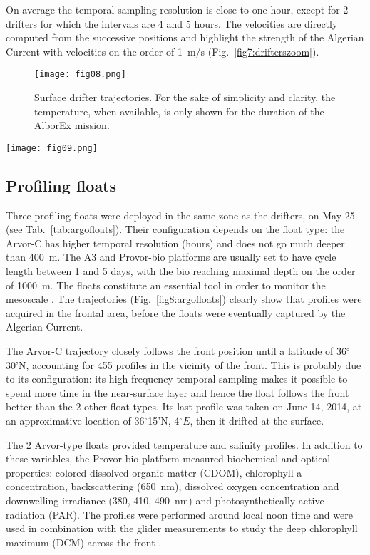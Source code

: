 \documentclass[essd,manuscript]{copernicus}
\begin{document}
On average the temporal sampling resolution is close to one hour, except for 2 drifters for which the intervals are 4 and 5 hours. The velocities are directly computed from the successive positions and highlight the strength of the Algerian Current with velocities on the order of 1~m/s (Fig.~\ref{fig7:drifterszoom}).    

\begin{figure}[t]
\texttt{[image: fig08.png]}
\caption{Surface drifter trajectories. For the sake of simplicity and clarity, the temperature, when available, is only shown for the duration of the AlborEx mission.\label{fig3:drifters}}
\end{figure}

\begin{figure*}[h]
\texttt{[image: fig09.png]}
\caption{Drifter temperature (left-hand side) and velocity in the area of study.\label{fig7:drifterszoom}}
\end{figure*}


\subsection{Profiling floats}

Three profiling floats were deployed in the same zone as the drifters, on May 25 (see Tab.~\ref{tab:argofloats}). Their configuration depends on the float type: the Arvor-C has higher temporal resolution (hours) and does not go much deeper than 400~m. The A3 and Provor-bio platforms are usually set to have cycle length between 1 and 5 days, with the bio reaching maximal depth on the order of 1000~m. The floats constitute an essential tool in order to monitor the mesoscale \citep{SANCHEZROMAN17}. The trajectories (Fig.~\ref{fig8:argofloats}) clearly show that profiles were acquired in the frontal area, before the floats were eventually captured by the Algerian Current. 

The Arvor-C trajectory closely follows the front position until a latitude of 36$^{\circ}$30'N, accounting for 455 profiles in the vicinity of the front. This is probably due to its configuration: its high frequency temporal sampling makes it possible to spend more time in the near-surface layer and hence the float follows the front better than the 2 other float types. Its last profile was taken on June 14, 2014, at an approximative location of 36$^{\circ}$15'N, 4$^{\circ}E$, then it drifted at the surface.

The 2 Arvor-type floats provided temperature and salinity profiles. In addition to these variables, the Provor-bio platform measured biochemical and optical properties: colored dissolved organic matter (CDOM), chlorophyll-a concentration, backscattering (650~nm), dissolved oxygen concentration and downwelling  irradiance (380, 410, 490~nm) and photosynthetically active radiation (PAR). The profiles were performed around local noon time and were used in combination with the glider measurements to study the deep chlorophyll maximum (DCM) across the front \citep{OLITA17}.
\end{document}
